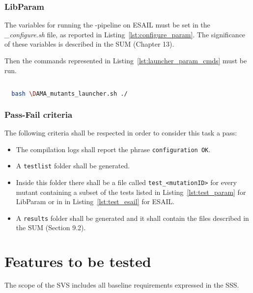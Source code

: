 \subsubsection{LibParam}

The variables for running the \DAMA-pipeline on ESAIL must be set in the \emph{\DAMA\_configure.sh} file, as reported in Listing~\ref{lst:configure_param}. The significance of these variables is described in the SUM (Chapter 13).

Then the commands represented in Listing~\ref{lst:launcher_param_cmds} must be run.

  \begin{lstlisting}[language=bash, label={lst:launcher_param_cmds}]

  bash \DAMA_mutants_launcher.sh ./

  \end{lstlisting}

\subsubsection{Pass-Fail criteria}

The following criteria shall be respected in order to consider this task a pass:

\begin{itemize}
  \item The compilation logs shall report the phrase \texttt{configuration OK}.
  \item A \texttt{testlist} folder shall be generated.
  \item Inside this folder there shall be a file called \texttt{test\_<mutationID>} for every mutant containing a subset of the tests listed in Listing~\ref{lst:test_param} for LibParam or in in Listing~\ref{lst:test_esail} for ESAIL.
  \item A \texttt{results} folder shall be generated and it shall contain the files described in the SUM (Section 9.2).
\end{itemize}

\ENDCHANGEDFINAL

\section{Features to be tested}
The scope of the SVS includes all baseline requirements expressed in the SSS.


